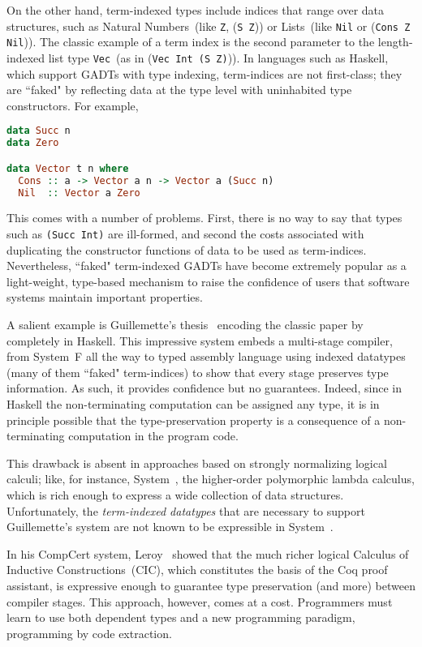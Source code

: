 On the other hand, term-indexed types include indices that range over data
structures, such as Natural Numbers~(like {\tt Z}, {(\tt S
Z})) or Lists~(like {\tt Nil} or ({\tt Cons Z Nil})). 
The classic example of a term index is the second
parameter to the length-indexed list type {\tt Vec}~(as in ({\tt Vec Int
(S Z)})).  In languages such as Haskell, which support GADTs with type indexing,
term-indices are not first-class; they are ``faked" by reflecting data at the
type level with uninhabited type constructors. For example,\vspace*{-1pt}
\begin{lstlisting}[basicstyle={\ttfamily\small},language=Haskell,mathescape]
data Succ n
data Zero

data Vector t n where
  Cons :: a -> Vector a n -> Vector a (Succ n)
  Nil  :: Vector a Zero
\end{lstlisting}\vspace*{-1pt}
This comes with a number of problems. First, there is no way to say
that types such as {\tt (Succ Int)} are ill-formed, and second the costs
associated with duplicating the constructor functions of data to be used
as term-indices.
Nevertheless, ``faked" term-indexed GADTs have become extremely
popular as a light-weight, type-based mechanism
to raise the confidence of users that software systems maintain important
properties.  

A salient example is Guillemette's thesis~\cite{guillemetteThesis}
encoding the classic paper by~\citet{tal-toplas} completely
in Haskell. This impressive system embeds a multi-stage compiler, from
System~F all the way to typed assembly language using indexed datatypes
(many of them ``faked" term-indices) to
show that every stage preserves type information.
%
As such, it provides confidence but no guarantees.  Indeed, since in
Haskell the non-terminating computation can be assigned any type, it is in
principle possible that the type-preservation property is a consequence of
a non-terminating computation in the program code.

This drawback is absent in approaches based on strongly normalizing
logical calculi; like, for instance, System~\Fw, the higher-order
polymorphic lambda calculus, which is rich enough to express a wide
collection of data structures.  Unfortunately, the \emph{term-indexed
datatypes} that are necessary to support Guillemette's system are not
known to be expressible in System~\Fw.

In his CompCert system, Leroy~\cite{Leroy-Compcert-CACM} showed that the
much richer logical Calculus of Inductive Constructions~(CIC), which
constitutes the basis of the Coq proof assistant, is expressive enough to
guarantee type preservation (and more) between compiler stages.  This
approach, however, comes at a cost.  Programmers must learn to use both
dependent types and a new programming paradigm, programming by code
extraction.


